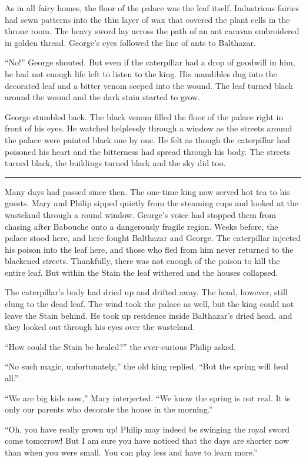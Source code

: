 \documentclass[10pt, draft]{memoir}
\renewcommand{\pfbreakdisplay}{\bigskip \ding{166} \bigskip}
\newcommand{\secbreak}{\fancybreak{\pfbreakdisplay}}
\begin{document}
As in all fairy homes, the floor of the palace was the leaf itself. Industrious fairies had sewn patterns into the thin layer of wax that covered the plant cells in the throne room. The heavy sword lay across the path of an ant caravan embroidered in golden thread. George's eyes followed the line of ants to Balthazar.

``No!'' George shouted. But even if the caterpillar had a drop of goodwill in him, he had not enough life left to listen to the king. His mandibles dug into the decorated leaf and a bitter venom seeped into the wound. The leaf turned black around the wound and the dark stain started to grow.

George stumbled back. The black venom filled the floor of the palace right in front of his eyes. He watched helplessly through a window as the streets around the palace were painted black one by one. He felt as though the caterpillar had poisoned his heart and the bitterness had spread through his body. The streets turned black, the buildings turned black and the sky did too.

\secbreak

Many days had passed since then. The one-time king now served hot tea to his guests. Mary and Philip sipped quietly from the steaming cups and looked at the wasteland through a round window. George's voice had stopped them from chasing after Babouche onto a dangerously fragile region. Weeks before, the palace stood here, and here fought Balthazar and George. The caterpillar injected his poison into the leaf here, and those who fled from him never returned to the blackened streets. Thankfully, there was not enough of the poison to kill the entire leaf. But within the Stain the leaf withered and the houses collapsed.

The caterpillar's body had dried up and drifted away. The head, however, still clung to the dead leaf. The wind took the palace as well, but the king could not leave the Stain behind. He took up residence inside Balthazar's dried head, and they looked out through his eyes over the wasteland.

``How could the Stain be healed?'' the ever-curious Philip asked.

``No such magic, unfortunately,'' the old king replied. ``But the spring will heal all.''

``We are big kids now,'' Mary interjected. ``We know the spring is not real. It is only our parents who decorate the house in the morning.''

``Oh, you have really grown up! Philip may indeed be swinging the royal sword come tomorrow! But I am sure you have noticed that the days are shorter now than when you were small. You can play less and have to learn more.''
\end{document}
